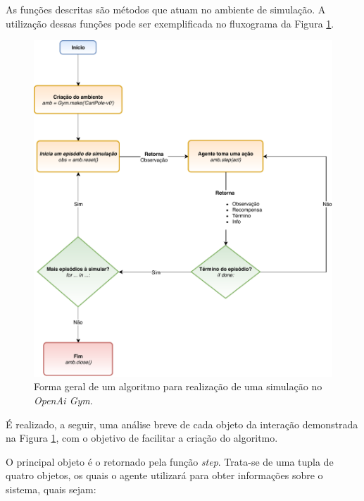 As funções descritas são métodos que atuam no ambiente de simulação. A utilização dessas funções pode ser exemplificada no fluxograma da Figura \ref{fig:2gym-ciclogym}.

\begin{figure}[H]
\centering
\includegraphics[width=1\linewidth]{02_desenvolvimento/02_PInv_Fig_CicloGym.pdf}
\caption{Forma geral de um algoritmo para realização de uma simulação no \textit{OpenAi Gym}.}\label{fig:2gym-ciclogym}
\end{figure}

É realizado, a seguir, uma análise breve de cada objeto da interação demonstrada na Figura \ref{fig:2gym-ciclogym}, com o objetivo de facilitar a criação do algoritmo.

O principal objeto é o retornado pela função \textit{step}. Trata-se de uma tupla de quatro objetos, os quais o agente utilizará para obter informações sobre o sistema, quais sejam:

